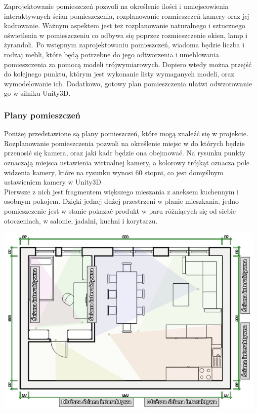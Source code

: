 \documentclass{article} %
\begin{document}
        Zaprojektowanie pomieszczeń pozwoli na określenie ilości i umiejscowienia interaktywnych ścian pomieszczenia, rozplanowanie rozmieszczeń kamery oraz jej kadrowanie. Ważnym aspektem jest też rozplanowanie naturalnego i sztucznego oświetlenia w pomieszczeniu co odbywa się poprzez rozmieszczenie okien, lamp i żyrandoli. Po wstępnym zaprojektowaniu pomieszczeń, wiadoma będzie liczba i rodzaj mebli, które będą potrzebne do jego odtworzenia i umeblowania pomieszczenia za pomocą modeli trójwymiarowych. Dopiero wtedy można przejść do kolejnego punktu, którym jest wykonanie listy wymaganych modeli, oraz wymodelowanie ich. Dodatkowo, gotowy plan pomieszczenia ułatwi odwzorowanie go w silniku Unity3D.
        \\
        
        \subsubsection{Plany pomieszczeń}
        Poniżej przedstawione są plany pomieszczeń, które mogą znaleźć się w projekcie. Rozplanowanie pomieszczenia pozwoli na określenie miejsc w do których będzie przenosić się kamera, oraz jaki kadr będzie ona obejmować. Na rysunku punkty oznaczają miejsca ustawienia wirtualnej kamery, a kolorowy trójkąt oznacza pole widzenia kamery, które na rysunku wynosi 60 stopni, co jest domyślnym ustawieniem kamery w Unity3D
        \\
        
        Pierwsze z nich jest fragmentem większego mieszania z aneksem kuchennym i osobnym pokojem. Dzięki jednej dużej przestrzeni w planie mieszkania, jedno pomieszczenie jest w stanie pokazać produkt w paru różniących się od siebie otoczeniach, w salonie, jadalni, kuchni i korytarzu. 
        \\
        \begin{center}
            \includegraphics[scale=0.5]{images/diagrams/big_salon.jpeg}
        \end{center}
        
\end{document}
